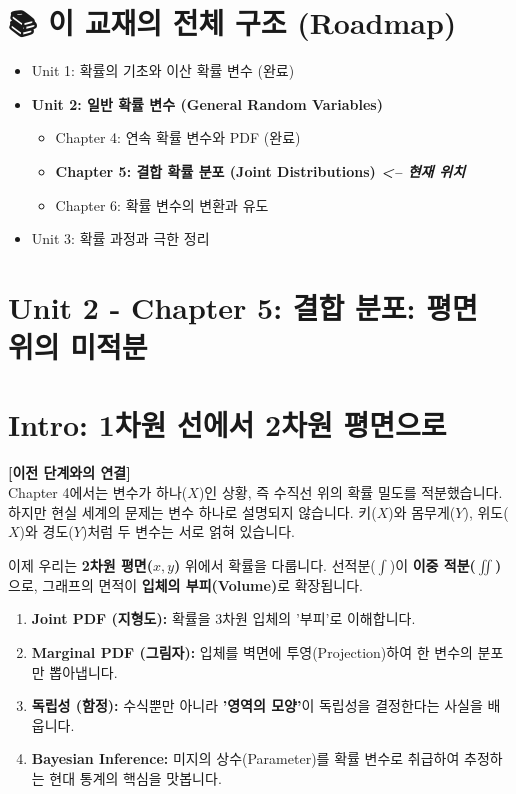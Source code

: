\documentclass[11pt,a4paper]{book}
\newcommand{\chaptertitle}[2]{\section*{#1: #2}}
\theoremstyle{definition}
\begin{document}
\section*{📚 이 교재의 전체 구조 (Roadmap)}
\begin{itemize}
    \item Unit 1: 확률의 기초와 이산 확률 변수 (완료)
    \item \textbf{Unit 2: 일반 확률 변수 (General Random Variables)}
    \begin{itemize}
        \item Chapter 4: 연속 확률 변수와 PDF (완료)
        \item[$\to$] \textbf{\textcolor{mainblue}{Chapter 5: 결합 확률 분포 (Joint Distributions) \textit{<-- 현재 위치}}}
        \item Chapter 6: 확률 변수의 변환과 유도
    \end{itemize}
    \item Unit 3: 확률 과정과 극한 정리
\end{itemize}
\vspace{1cm}

\chaptertitle{Unit 2 - Chapter 5}{결합 분포: 평면 위의 미적분}

\section*{Intro: 1차원 선에서 2차원 평면으로}

\textbf{[이전 단계와의 연결]} \\
Chapter 4에서는 변수가 하나($X$)인 상황, 즉 수직선 위의 확률 밀도를 적분했습니다. 하지만 현실 세계의 문제는 변수 하나로 설명되지 않습니다. 키($X$)와 몸무게($Y$), 위도($X$)와 경도($Y$)처럼 두 변수는 서로 얽혀 있습니다.

이제 우리는 \textbf{2차원 평면($x, y$)} 위에서 확률을 다룹니다. 선적분($\int$)이 \textbf{이중 적분($\iint$)}으로, 그래프의 면적이 \textbf{입체의 부피(Volume)}로 확장됩니다.

\begin{tcolorbox}[colback=subgray, title={\textbf{📌 이 단원의 핵심 개요 (Overview)}}]
\begin{enumerate}
    \item \textbf{Joint PDF (지형도):} 확률을 3차원 입체의 '부피'로 이해합니다.
    \item \textbf{Marginal PDF (그림자):} 입체를 벽면에 투영(Projection)하여 한 변수의 분포만 뽑아냅니다.
    \item \textbf{독립성 (함정):} 수식뿐만 아니라 \textbf{'영역의 모양'}이 독립성을 결정한다는 사실을 배웁니다.
    \item \textbf{Bayesian Inference:} 미지의 상수(Parameter)를 확률 변수로 취급하여 추정하는 현대 통계의 핵심을 맛봅니다.
\end{enumerate}
\end{tcolorbox}
\end{document}

